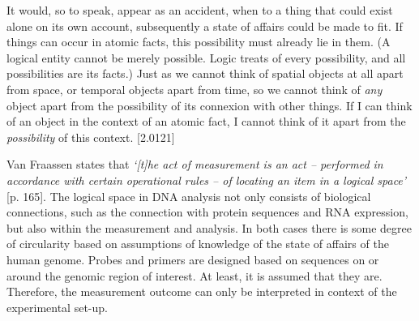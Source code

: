 \hfill\begin{minipage}{\dimexpr\textwidth-1cm}
It would, so to speak, appear as an accident, when to a thing that could exist alone on its own account, subsequently a state of affairs could be made to fit.
If things can occur in atomic facts, this possibility must already lie in them.
(A logical entity cannot be merely possible. Logic treats of every possibility, and all possibilities are its facts.)
Just as we cannot think of spatial objects at all apart from space, or temporal objects apart from time, so we cannot think of \textsl{any} object apart from the possibility of its connexion with other things.
If I can think of an object in the context of an atomic fact, I cannot think of it apart from the \textsl{possibility} of this context. \cite{Wittgenstein_1933}[2.0121]
\end{minipage} \newline \newline

\noindent Van Fraassen states that \textsl{‘[t]he act of measurement is an act – performed in accordance with certain operational rules – of locating an item in a logical space’} \cite{Fraassen_2008}[p. 165]. 
The logical space in DNA analysis not only consists of biological connections, such as the connection with protein sequences and RNA expression, but also within the measurement and analysis. 
In both cases there is some degree of circularity based on assumptions of knowledge of the state of affairs of the human genome. 
Probes and primers are designed based on sequences on or around the genomic region of interest. 
At least, it is assumed that they are. 
Therefore, the measurement outcome can only be interpreted in context of the experimental set-up.
 
